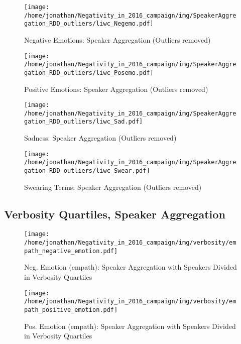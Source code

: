 \begin{figure}[h]\centering
	\texttt{[image: /home/jonathan/Negativity\_in\_2016\_campaign/img/SpeakerAggregation\_RDD\_outliers/liwc\_Negemo.pdf]}
	\caption{Negative Emotions: Speaker Aggregation (Outliers removed)}
	\label{fig: sa_Negative Emotions}
\end{figure}

\begin{figure}[h]\centering
	\texttt{[image: /home/jonathan/Negativity\_in\_2016\_campaign/img/SpeakerAggregation\_RDD\_outliers/liwc\_Posemo.pdf]}
	\caption{Positive Emotions: Speaker Aggregation (Outliers removed)}
	\label{fig: sa_Positive Emotions}
\end{figure}

\begin{figure}[h]\centering
	\texttt{[image: /home/jonathan/Negativity\_in\_2016\_campaign/img/SpeakerAggregation\_RDD\_outliers/liwc\_Sad.pdf]}
	\caption{Sadness: Speaker Aggregation (Outliers removed)}
	\label{fig: sa_Sadness}
\end{figure}

\begin{figure}[h]\centering
	\texttt{[image: /home/jonathan/Negativity\_in\_2016\_campaign/img/SpeakerAggregation\_RDD\_outliers/liwc\_Swear.pdf]}
	\caption{Swearing Terms: Speaker Aggregation (Outliers removed)}
	\label{fig: sa_Swearing Terms}
\end{figure}

\clearpage
\pagebreak

\subsection{Verbosity Quartiles, Speaker Aggregation}

\begin{figure}[h]\centering
	\texttt{[image: /home/jonathan/Negativity\_in\_2016\_campaign/img/verbosity/empath\_negative\_emotion.pdf]}
	\caption{Neg. Emotion (empath): Speaker Aggregation with Speakers Divided in Verbosity Quartiles}
	\label{fig: verbosity_Neg. Emotion (empath)}
\end{figure}

\begin{figure}[h]\centering
	\texttt{[image: /home/jonathan/Negativity\_in\_2016\_campaign/img/verbosity/empath\_positive\_emotion.pdf]}
	\caption{Pos. Emotion (empath): Speaker Aggregation with Speakers Divided in Verbosity Quartiles}
	\label{fig: verbosity_Pos. Emotion (empath)}
\end{figure}

